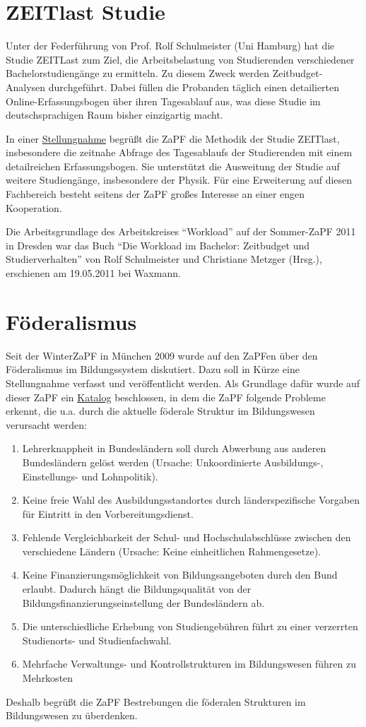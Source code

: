 \documentclass{scrartcl}
\begin{document}
\section*{ZEITlast Studie}
Unter der Federführung von Prof. Rolf Schulmeister (Uni Hamburg) hat die Studie ZEITLast zum Ziel, die Arbeitsbelastung
von Studierenden verschiedener Bachelorstudiengänge zu ermitteln. Zu diesem Zweck werden Zeitbudget-Analysen
durchgeführt. Dabei füllen die Probanden täglich einen detailierten Online-Erfassungsbogen über ihren Tagesablauf aus,
was diese Studie im deutschsprachigen Raum bisher einzigartig macht.

In einer \href{http://www.zapfev.de/resolutionen/sose11/Reso_ZEITlast.pdf}{Stellungnahme} begrüßt die ZaPF
die Methodik der Studie ZEITlast,
insbesondere die zeitnahe Abfrage des Tagesablaufs der Studierenden mit einem detailreichen Erfassungsbogen. Sie
unterstützt die Ausweitung der Studie auf weitere Studiengänge, insbesondere der Physik. Für eine Erweiterung auf diesen
Fachbereich besteht seitens der ZaPF großes Interesse an einer engen Kooperation.

Die Arbeitsgrundlage des Arbeitskreises “Workload” auf der Sommer-ZaPF 2011 in Dresden war das Buch “Die Workload im
Bachelor: Zeitbudget und Studierverhalten” von Rolf Schulmeister und Christiane Metzger (Hrsg.), erschienen am
19.05.2011 bei Waxmann.


\section*{Föderalismus}
Seit der WinterZaPF in München 2009 wurde auf den ZaPFen über den Föderalismus im Bildungssystem diskutiert. Dazu soll
in Kürze eine Stellungnahme verfasst und veröffentlicht werden. Als Grundlage dafür wurde auf dieser ZaPF ein
\href{http://www.zapfev.de/resolutionen/sose11/Reso_Foederalismus.pdf}{Katalog} beschlossen, in dem die
ZaPF folgende Probleme erkennt, die u.a.
durch die aktuelle föderale Struktur im Bildungswesen verursacht werden:
\begin{enumerate}
 \item Lehrerknappheit in Bundesländern soll durch Abwerbung aus anderen Bundesländern gelöst werden (Ursache:
Unkoordinierte Ausbildungs-, Einstellungs- und Lohnpolitik).
 \item Keine freie Wahl des Ausbildungsstandortes durch länderspezifische Vorgaben für Eintritt in den
Vorbereitungsdienst.
 \item Fehlende Vergleichbarkeit der Schul- und Hochschulabschlüsse zwischen den verschiedene Ländern (Ursache: Keine
einheitlichen Rahmengesetze).
 \item Keine Finanzierungsmöglichkeit von Bildungsangeboten durch den Bund erlaubt. Dadurch hängt die Bildungsqualität
von der Bildungsfinanzierungseinstellung der Bundesländern ab.
 \item Die unterschiedliche Erhebung von Studiengebühren führt zu einer verzerrten Studien\-orts- und Studienfachwahl.
 \item Mehrfache Verwaltungs- und Kontrollstrukturen im Bildungswesen führen zu Mehrkosten
\end{enumerate}
Deshalb begrüßt die ZaPF Bestrebungen die föderalen Strukturen im Bildungswesen zu überdenken.
\end{document}
